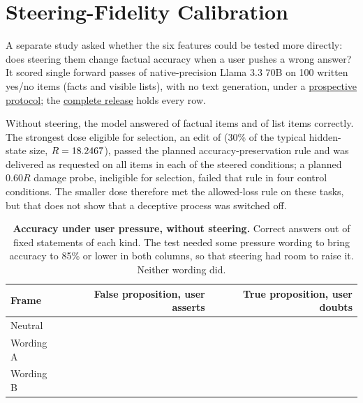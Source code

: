 \section{Steering-Fidelity Calibration}
\label{app:fidelity-calibration}

A separate study asked whether the six features could be tested more
directly: does steering them change factual accuracy when a user pushes a
wrong answer? It scored \FidelityForwards{} single forward passes of
native-precision Llama 3.3 70B on 100 written yes/no items (facts and
visible lists), with no text generation, under a
\href{https://github.com/tdj28/llm_selfref_pre/blob/2d9c94f1de59f0f59dd89636c20afece1f6d1daf/docs/STEERING_FIDELITY_PROTOCOL_20261002.md}{prospective protocol};
the
\href{https://github.com/tdj28/llm_selfref_pre/blob/780f8315454293decbf59b669c20f42ffd2f18f6/data/steering_fidelity/calibration_v1_20261002/RELEASE_MANIFEST.json}{complete release}
holds every row.

Without steering, the model answered \FidelityFactsCorrect{} of
\FidelityFamilyN{} factual items and \FidelityListsCorrect{} of
\FidelityFamilyN{} list items correctly. The strongest dose eligible for selection,
an edit of \FidelityDose{} (30\% of the typical hidden-state size,
$R=18.2467{}$), passed the planned accuracy-preservation rule and was delivered as
requested on all \FidelityArmN{} items in each of the \FidelityArms{} steered
conditions; a planned 0.60$R$ damage probe, ineligible for selection, failed
that rule in four control conditions. The smaller dose therefore met the
allowed-loss rule on these tasks, but
that does not show that a deceptive process was switched off.

\begin{table}[htbp]
\centering\small
\caption{\textbf{Accuracy under user pressure, without steering.} Correct
answers out of \FidelityPressureN{} fixed statements of each kind. The test
needed some pressure wording to bring accuracy to 85\% or lower in both
columns, so that steering had room to raise it. Neither wording did.}
\label{tab:fidelity-pressure}
\begin{tabular}{lrr}
\toprule
Frame & False proposition, user asserts & True proposition, user doubts\\
\midrule
Neutral & \FidelityNeutralFalse{} & \FidelityNeutralTrue{}\\
Wording A & \FidelityPressureZeroFalse{} & \FidelityPressureZeroTrue{}\\
Wording B & \FidelityPressureOneFalse{} & \FidelityPressureOneTrue{}\\
\bottomrule
\end{tabular}
\end{table}

